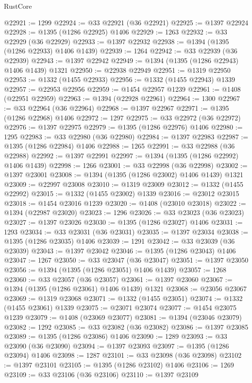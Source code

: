 \begin{lexlean}{RustCore}
\begin{coremodule}
@22921 := 1299
@22924 := @33 @22921 (@36 @22921)
@22925 := @1397 @22924
@22928 := @1395 (@1286 @22925) @1406
@22929 := 1263
@22932 := @33 @22929 (@36 @22929)
@22933 := @1397 @22932
@22938 := @1394 (@1395 (@1286 @22933) @1406 @1439)
@22939 := 1264
@22942 := @33 @22939 (@36 @22939)
@22943 := @1397 @22942
@22949 := @1394 (@1395 (@1286 @22943) @1406 @1439) @1321
@22950 := @22938 @22949
@22951 := @1319 @22950
@22953 := @1332 (@1455 @22933)
@22956 := @1332 (@1455 @22943) @1339
@22957 := @22953 @22956
@22959 := @1454 @22957 @1239
@22961 := @1408 (@22951 @22959)
@22963 := @1394 (@22928 @22961)
@22964 := 1300
@22967 := @33 @22964 (@36 @22964)
@22968 := @1397 @22967
@22971 := @1395 (@1286 @22968) @1406
@22972 := 1297
@22975 := @33 @22972 (@36 @22972)
@22976 := @1397 @22975
@22979 := @1395 (@1286 @22976) @1406
@22980 := 1295
@22983 := @33 @22980 (@36 @22980)
@22984 := @1397 @22983
@22987 := @1395 (@1286 @22984) @1406
@22988 := 1265
@22991 := @33 @22988 (@36 @22988)
@22992 := @1397 @22991
@22997 := @1394 (@1395 (@1286 @22992) @1406 @1439)
@22998 := 1266
@23001 := @33 @22998 (@36 @22998)
@23002 := @1397 @23001
@23008 := @1394 (@1395 (@1286 @23002) @1406 @1439) @1321
@23009 := @22997 @23008
@23010 := @1319 @23009
@23012 := @1332 (@1455 @22992)
@23015 := @1332 (@1455 @23002) @1339
@23016 := @23012 @23015
@23018 := @1454 @23016 @1239
@23020 := @1408 (@23010 @23018)
@23022 := @1394 (@22987 @23020)
@23023 := 1296
@23026 := @33 @23023 (@36 @23023)
@23027 := @1397 @23026
@23030 := @1395 (@1286 @23027) @1406
@23031 := 1293
@23034 := @33 @23031 (@36 @23031)
@23035 := @1397 @23034
@23038 := @1395 (@1286 @23035) @1406
@23039 := 1291
@23042 := @33 @23039 (@36 @23039)
@23043 := @1397 @23042
@23046 := @1395 (@1286 @23043) @1406
@23047 := 1267
@23050 := @33 @23047 (@36 @23047)
@23051 := @1397 @23050
@23056 := @1394 (@1395 (@1286 @23051) @1406 @1439)
@23057 := 1268
@23060 := @33 @23057 (@36 @23057)
@23061 := @1397 @23060
@23067 := @1394 (@1395 (@1286 @23061) @1406 @1439) @1321
@23068 := @23056 @23067
@23069 := @1319 @23068
@23071 := @1332 (@1455 @23051)
@23074 := @1332 (@1455 @23061) @1339
@23075 := @23071 @23074
@23077 := @1454 @23075 @1239
@23079 := @1408 (@23069 @23077)
@23081 := @1394 (@23046 @23079)
@23082 := 1292
@23085 := @33 @23082 (@36 @23082)
@23086 := @1397 @23085
@23089 := @1395 (@1286 @23086) @1406
@23090 := 1289
@23093 := @33 @23090 (@36 @23090)
@23094 := @1397 @23093
@23097 := @1395 (@1286 @23094) @1406
@23098 := 1287
@23101 := @33 @23098 (@36 @23098)
@23102 := @1397 @23101
@23105 := @1395 (@1286 @23102) @1406
@23106 := 1269
@23109 := @33 @23106 (@36 @23106)
@23110 := @1397 @23109

\end{coremodule}
\end{lexlean}
